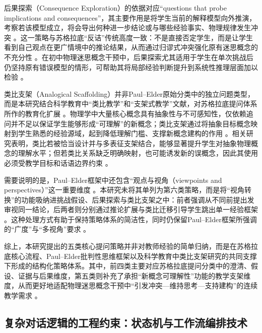 后果探索（Consequence Exploration）的依据对应“questions that probe implications and consequences”，其主要作用是将学生当前的解释模型向外推演，考察若该模型成立，将会导出何种进一步结论或与哪些经验事实、物理规律发生冲突 \citep{paul2007socratic,paul2010criticalthinking}。这一策略与苏格拉底“反诘”传统高度一致：不是直接否定学生，而是让学生看到自己观点在更广情境中的推论结果，从而通过归谬式冲突强化原有迷思概念的不充分性 \citep{gogus2018socraticquestioning,kraut2026socraticmethod}。在初中物理迷思概念干预中，后果探索尤其适用于学生在单次挑战后仍坚持原有错误模型的情形，可帮助其将局部经验判断提升到系统性推理层面加以检验 \citep{lizhengde2025misconception}。

类比支架（Analogical Scaffolding）并非Paul--Elder原始分类中的独立问题类型，而是本研究结合科学教育中“类比教学”和“支架式教学”文献，对苏格拉底提问体系所作的教育化扩展 \citep{podolefsky2007analogical,lin2012scaffolding}。物理学中大量核心概念具有抽象性与不可感知性，仅依赖追问并不足以保证学生能够形成“可理解”的新概念；类比支架通过将抽象目标概念映射到学生熟悉的经验源域，起到降低理解门槛、支撑新概念建构的作用 \citep{podolefsky2007analogical,brown1992analogies}。相关研究表明，类比若被恰当设计并与多表征支架结合，能够显著提升学生对抽象物理概念的理解水平；但若类比关系缺乏明确映射，也可能诱发新的误概念，因此其使用必须受教学目标和话语边界约束 \citep{podolefsky2007analogical,eriksson2026analogy}。

需要说明的是，Paul--Elder框架中还包含“观点与视角（viewpoints and perspectives）”这一重要维度 \citep{paul2007socratic}。本研究未将其单列为第六类策略，而是将“视角转换”的功能吸纳进挑战假设、后果探索与类比支架之中：前者强调从不同前提出发审视同一结论，后两者则分别通过推论扩展与类比迁移引导学生跳出单一经验框架 \citep{paul2007socratic,zhao2024isocratic}。这种处理方式有助于保持策略体系的简洁性，同时仍保留Paul--Elder框架所强调的“广度”与“多视角”要求 \citep{paul2010criticalthinking}。

综上，本研究提出的五类核心提问策略并非对教师经验的简单归纳，而是在苏格拉底核心流程、Paul--Elder批判性思维框架以及科学教育中类比支架研究的共同支撑下形成的结构化策略体系。其中，前四类主要对应苏格拉底提问分类中的澄清、假设、证据与后果维度，第五类则补充了承担“新概念可理解性”功能的教学支架维度，从而更好地适配物理迷思概念干预中“引发冲突—维持思考—支持建构”的连续教学需求 \citep{paul2007socratic,podolefsky2007analogical,olaogun2025predictors}。


\subsection{复杂对话逻辑的工程约束：状态机与工作流编排技术}

